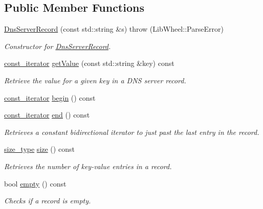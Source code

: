 \subsection*{\-Public \-Member \-Functions}
\begin{DoxyCompactItemize}
\item 
\hyperlink{classNERD_1_1DnsServerRecord_a9e64bf4fc8f8f0dc2615809f9ce487bd}{\-Dns\-Server\-Record} (const std\-::string \&s)  throw (\-Lib\-Wheel\-::\-Parse\-Error)
\begin{DoxyCompactList}\small\item\em \-Constructor for \hyperlink{classNERD_1_1DnsServerRecord}{\-Dns\-Server\-Record}. \end{DoxyCompactList}\item 
\hyperlink{classNERD_1_1DnsServerRecord_a870208456774471b644a9715f88d4ea6}{const\-\_\-iterator} \hyperlink{classNERD_1_1DnsServerRecord_a870088e0f9b25fa8638518dc61efbd6a}{get\-Value} (const std\-::string \&key) const 
\begin{DoxyCompactList}\small\item\em \-Retrieve the value for a given key in a \-D\-N\-S server record. \end{DoxyCompactList}\item 
\hyperlink{classNERD_1_1DnsServerRecord_a870208456774471b644a9715f88d4ea6}{const\-\_\-iterator} \hyperlink{classNERD_1_1DnsServerRecord_a1aba903a80201ef9f31feebd15d3de58}{begin} () const 
\item 
\hyperlink{classNERD_1_1DnsServerRecord_a870208456774471b644a9715f88d4ea6}{const\-\_\-iterator} \hyperlink{classNERD_1_1DnsServerRecord_ac66bbdc0eb78b35c61e95a5736390e64}{end} () const 
\begin{DoxyCompactList}\small\item\em \-Retrieves a constant bidirectional iterator to just past the last entry in the record. \end{DoxyCompactList}\item 
\hyperlink{classNERD_1_1DnsServerRecord_a51602195a3768bfdac0b69fb76358167}{size\-\_\-type} \hyperlink{classNERD_1_1DnsServerRecord_abf8b92d7742f01b17b9f6593236c7ac5}{size} () const 
\begin{DoxyCompactList}\small\item\em \-Retrieves the number of key-\/value entries in a record. \end{DoxyCompactList}\item 
bool \hyperlink{classNERD_1_1DnsServerRecord_a061b022eb838ab65d051cf10eec01e8c}{empty} () const 
\begin{DoxyCompactList}\small\item\em \-Checks if a record is empty. \end{DoxyCompactList}\end{DoxyCompactItemize}
